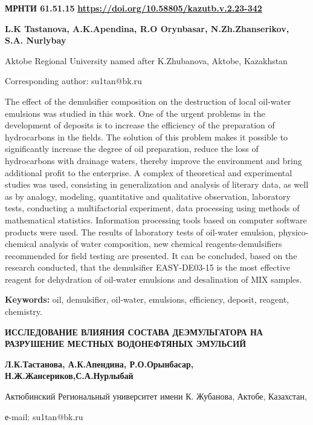 \newpage
{\bfseries МРНТИ 61.51.15}
\hfill {\bfseries \href{https://doi.org/10.58805/kazutb.v.2.23-342}{https://doi.org/10.58805/kazutb.v.2.23-342}}


\begin{center}
{\bfseries L.K Tastanova, A.K.Apendina, R.O Orynbasar, N.Zh.Zhanserikov, S.A. Nurlybay}

Aktobe Regional University named after K.Zhubanova, Aktobe, Kazakhstan

Corresponding author: su1tan@bk.ru
\end{center}

The effect of the demulsifier composition on the destruction of local
oil-water emulsions was studied in this work. One of the urgent problems
in the development of deposits is to increase the efficiency of the
preparation of hydrocarbons in the fields. The solution of this problem
makes it possible to significantly increase the degree of oil
preparation, reduce the loss of hydrocarbons with drainage waters,
thereby improve the environment and bring additional profit to the
enterprise. A complex of theoretical and experimental studies was used,
consisting in generalization and analysis of literary data, as well as
by analogy, modeling, quantitative and qualitative observation,
laboratory tests, conducting a multifactorial experiment, data
processing using methods of mathematical statistics. Information
processing tools based on computer software products were used. The
results of laboratory tests of oil-water emulsion, physico-chemical
analysis of water composition, new chemical reagents-demulsifiers
recommended for field testing are presented. It can be concluded, based
on the research conducted, that the demulsifier EASY-DE03-15 is the most
effective reagent for dehydration of oil-water emulsions and
desalination of MIX samples.

{\bfseries Keywords:} oil, demulsifier, oil-water, emulsions, efficiency,
deposit, reagent, chemistry.

\begin{center}
{\large\bfseries ИССЛЕДОВАНИЕ ВЛИЯНИЯ СОСТАВА ДЕЭМУЛЬГАТОРА НА РАЗРУШЕНИЕ МЕСТНЫХ ВОДОНЕФТЯНЫХ ЭМУЛЬСИЙ}

{\bfseries Л.К.Тастанова, А.К.Апендина, Р.О.Орынбасар, Н.Ж.Жансериков,С.А.Нурлыбай}

Актюбинский Региональный университет имени К. Жубанова, Актобе,
Казахстан,

е-mail: su1tan@bk.ru
\end{center}

